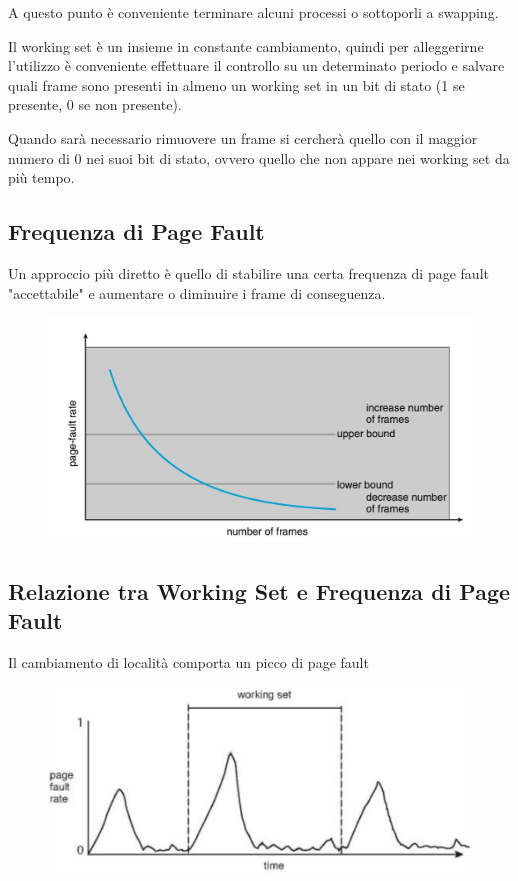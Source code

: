 A questo punto è conveniente terminare alcuni processi o sottoporli a swapping.

\spacer
Il working set è un insieme in constante cambiamento, quindi per alleggerirne l'utilizzo è conveniente effettuare il controllo su un determinato periodo e salvare quali frame sono presenti in almeno un working set in un bit di stato (1 se presente, 0 se non presente).

Quando sarà necessario rimuovere un frame si cercherà quello con il maggior numero di 0 nei suoi bit di stato, ovvero quello che non appare nei working set da più tempo.

\subsection{Frequenza di Page Fault}
Un approccio più diretto è quello di stabilire una certa frequenza di page fault "accettabile" e aumentare o diminuire i frame di conseguenza.

\begin{figure}[H]
    \centering
    \includegraphics[width=0.5\linewidth]{assets/frequenza-page-fault.jpg}
\end{figure}

\subsection{Relazione tra Working Set e Frequenza di Page Fault}
Il cambiamento di località comporta un picco di page fault

\begin{figure}[H]
    \centering
    \includegraphics[width=0.5\linewidth]{assets/page-fault-working-set.png}
\end{figure}
